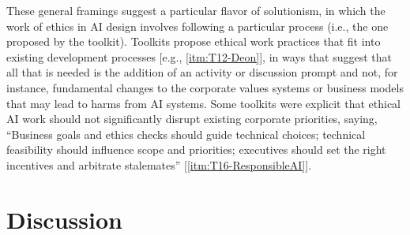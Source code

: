 \documentclass[acmsmall]{acmart}
\begin{document}
These general framings suggest a particular flavor of solutionism, in which the work 
of ethics in AI design involves following a particular process (i.e., the one proposed by the toolkit). 
Toolkits propose ethical work practices that fit into existing development processes [e.g., \ref{itm:T12-Deon}], in ways that suggest that all that is needed is the addition of an activity or discussion prompt and not, for instance, fundamental changes to the corporate values systems or business models that may lead to harms from AI systems. Some toolkits were explicit that ethical AI work should not significantly disrupt existing corporate priorities, saying, ``Business goals and ethics checks should guide technical choices; technical feasibility should influence scope and priorities; executives should set the right incentives and arbitrate stalemates'' [\ref{itm:T16-ResponsibleAI}]. 




\section{Discussion}
\end{document}
